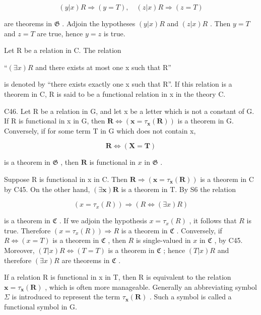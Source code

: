 \[
(y | x) R \Longrightarrow (y = T), \quad (z | x) R \Longrightarrow (z = T)
\]

are theorems in \(\mathfrak{G}\) . Adjoin the hypotheses \((y|x)R\) and \((z|x)R\) . Then \(y = T\) and \(z = T\) are true, hence \(y = z\) is true.

Let R be a relation in C. The relation

``\((\exists x)R\) and there exists at most one x such that R''

is denoted by ``there exists exactly one x such that R''. If this relation is a theorem in C, R is said to be a functional relation in x in the theory C.

C46. Let R be a relation in G, and let x be a letter which is not a constant of G. If R is functional in x in G, then \(\mathbf{R} \Longleftrightarrow (\mathbf{x} = \tau_{\mathbf{x}}(\mathbf{R}))\) is a theorem in G. Conversely, if for some term T in G which does not contain x,

\[
\boldsymbol {R} \Longleftrightarrow (\boldsymbol {X} = \boldsymbol {T})
\]

is a theorem in \(\mathfrak{G}\) , then \(\pmb{R}\) is functional in \(x\) in \(\mathfrak{G}\) .

Suppose R is functional in x in C. Then \(\boldsymbol{R} \Longrightarrow (\boldsymbol{x} = \tau_{\boldsymbol{x}}(\boldsymbol{R}))\) is a theorem in C by C45. On the other hand, \((\exists \boldsymbol{x})\boldsymbol{R}\) is a theorem in T. By S6 the relation

\[
(x = \tau_ {x} (R)) \Longrightarrow (R \Longleftrightarrow (\exists x) R)
\]

is a theorem in \(\mathfrak{C}\) . If we adjoin the hypothesis \(x = \tau_x(R)\) , it follows that \(R\) is true. Therefore \((x = \tau_x(R)) \Longrightarrow R\) is a theorem in \(\mathfrak{C}\) . Conversely, if \(R \Longleftrightarrow (x = T)\) is a theorem in \(\mathfrak{C}\) , then \(R\) is single-valued in \(x\) in \(\mathfrak{C}\) , by C45. Moreover, \((T|x)R \Longleftrightarrow (T = T)\) is a theorem in \(\mathfrak{C}\) ; hence \((T|x)R\) and therefore \((\exists x)R\) are theorems in \(\mathfrak{C}\) .

If a relation R is functional in x in T, then R is equivalent to the relation \(\boldsymbol{x} = \tau_{\boldsymbol{x}}(\boldsymbol{R})\) , which is often more manageable. Generally an abbreviating symbol \(\Sigma\) is introduced to represent the term \(\tau_{\boldsymbol{x}}(\boldsymbol{R})\) . Such a symbol is called a functional symbol in G.

